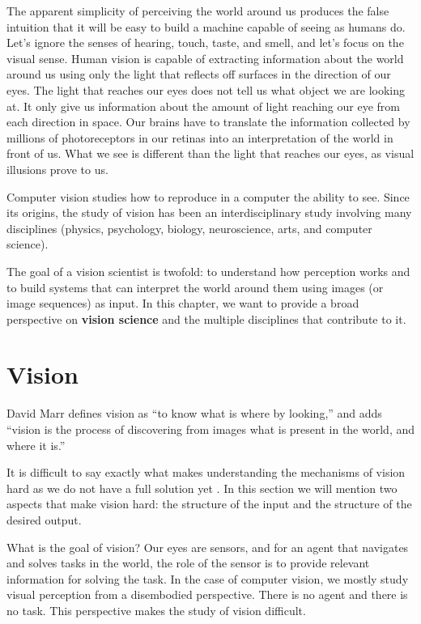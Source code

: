 The apparent simplicity of perceiving the world around us produces the false intuition that it will be easy to build a machine capable of seeing as humans do. Let's ignore the senses of hearing, touch, taste, and smell, and let's focus on the visual sense. Human vision is capable of extracting information about the world around us using only the light that reflects off surfaces in the direction of our eyes. The light that reaches our eyes does not tell us what object we are looking at. It only give us information about the amount of light reaching our eye from each direction in space. Our brains have to translate the information collected by millions of photoreceptors in our retinas into an interpretation of the world in front of us. What we see is different than the light that reaches our eyes, as visual illusions prove to us.  

Computer vision studies how to reproduce in a computer the ability to see. Since its origins, the study of vision has been an interdisciplinary study involving many disciplines (physics, psychology, biology, neuroscience, arts, and computer science).

The goal of a vision scientist is twofold: to understand how perception works and to build systems that can interpret the world around them using images (or image sequences) as input. In this chapter, we want to provide a broad perspective on {\bf vision science} and the multiple disciplines that contribute to it.


\section{Vision}

David Marr \cite{Marr82} defines vision as ``to know what is where by looking,'' and  adds ``vision is the process of discovering from images what is present in the world, and where it is.''

It is difficult to say exactly what makes understanding the mechanisms of vision hard as we do not have a full solution yet \cite{Cavanagh96}. In this section we will mention two  aspects that make vision hard: the structure of the input and the structure of the desired output.

What is the goal of vision? Our eyes are sensors, and for an agent that navigates and solves tasks in the world, the role of the sensor is to provide relevant information for solving the task. In the case of computer vision, we mostly study visual perception from a disembodied perspective. There is no agent and there is no task. This perspective makes the study of vision difficult.


